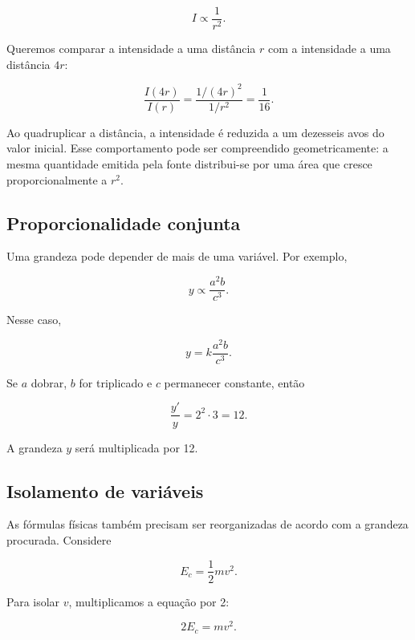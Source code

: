 \begin{equation}
  I\propto\frac{1}{r^2}.
\end{equation}

Queremos comparar a intensidade a uma distância $r$ com a intensidade a uma distância $4r$:

\begin{equation}
  \frac{I(4r)}{I(r)}
  =\frac{1/(4r)^2}{1/r^2}
  =\frac{1}{16}.
\end{equation}

Ao quadruplicar a distância, a intensidade é reduzida a um dezesseis avos do valor inicial. Esse comportamento pode ser compreendido geometricamente: a mesma quantidade emitida pela fonte distribui-se por uma área que cresce proporcionalmente a $r^2$.

\subsection{Proporcionalidade conjunta}

Uma grandeza pode depender de mais de uma variável. Por exemplo,

\begin{equation}
  y\propto\frac{a^2b}{c^3}.
\end{equation}

Nesse caso,

\begin{equation}
  y=k\frac{a^2b}{c^3}.
\end{equation}

Se $a$ dobrar, $b$ for triplicado e $c$ permanecer constante, então

\begin{equation}
  \frac{y'}{y}=2^2\cdot3=12.
\end{equation}

A grandeza $y$ será multiplicada por 12.

\subsection{Isolamento de variáveis}

As fórmulas físicas também precisam ser reorganizadas de acordo com a grandeza procurada. Considere

\begin{equation}
  E_c=\frac{1}{2}mv^2.
\end{equation}

Para isolar $v$, multiplicamos a equação por 2:

\begin{equation}
  2E_c=mv^2.
\end{equation}

